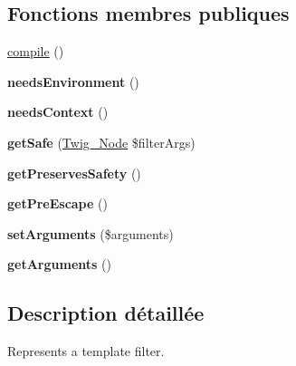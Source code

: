 \subsection*{Fonctions membres publiques}
\begin{DoxyCompactItemize}
\item 
\hyperlink{interface_twig___filter_interface_a3815e7c2e73f00c2ebffcf5b90eef3b1}{compile} ()
\item 
{\bfseries needs\+Environment} ()\hypertarget{interface_twig___filter_interface_a711311882c7dd1058f92f7eb0e8edeeb}{}\label{interface_twig___filter_interface_a711311882c7dd1058f92f7eb0e8edeeb}

\item 
{\bfseries needs\+Context} ()\hypertarget{interface_twig___filter_interface_a52c35bc6da8861f40aa59f1b99f7ef0f}{}\label{interface_twig___filter_interface_a52c35bc6da8861f40aa59f1b99f7ef0f}

\item 
{\bfseries get\+Safe} (\hyperlink{class_twig___node}{Twig\+\_\+\+Node} \$filter\+Args)\hypertarget{interface_twig___filter_interface_acc5701ec146ba15919020bbc42941632}{}\label{interface_twig___filter_interface_acc5701ec146ba15919020bbc42941632}

\item 
{\bfseries get\+Preserves\+Safety} ()\hypertarget{interface_twig___filter_interface_a7fc1becef9ade703f0c381e579d5a879}{}\label{interface_twig___filter_interface_a7fc1becef9ade703f0c381e579d5a879}

\item 
{\bfseries get\+Pre\+Escape} ()\hypertarget{interface_twig___filter_interface_a4b7863ed7e994206f25a6c84cbc59116}{}\label{interface_twig___filter_interface_a4b7863ed7e994206f25a6c84cbc59116}

\item 
{\bfseries set\+Arguments} (\$arguments)\hypertarget{interface_twig___filter_interface_a2b7df0e0f61ee886144db2d59fc0d7da}{}\label{interface_twig___filter_interface_a2b7df0e0f61ee886144db2d59fc0d7da}

\item 
{\bfseries get\+Arguments} ()\hypertarget{interface_twig___filter_interface_a1d4c324c5a088be98d99d3efbf3502e1}{}\label{interface_twig___filter_interface_a1d4c324c5a088be98d99d3efbf3502e1}

\end{DoxyCompactItemize}


\subsection{Description détaillée}
Represents a template filter.

